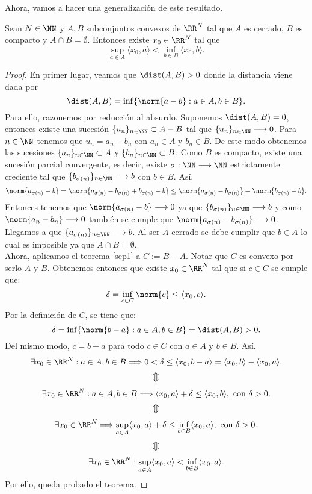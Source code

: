 Ahora, vamos a hacer una generalización de este resultado.

\bigskip
\begin{teoremaBox}\label{separacion1}
Sean $ N\in \NN $ y $ A,B $ subconjuntos convexos de $ \RR^N $ tal que $ A $ es cerrado, $ B $ es compacto y $ A \cap B = \emptyset$. Entonces existe $ x_0 \in \RR^N $ tal que
\[
\sup_{a \in A} \langle x_0,a\rangle < \inf_{b\in B} \langle x_0,b\rangle.
\]
\end{teoremaBox}
\begin{proof}
En primer lugar, veamos que $ \dist(A,B) > 0 $ donde la distancia viene dada por \[\dist(A,B) = \inf\{ \norm{a-b} : a\in A, b\in B\}.\]
Para ello, razonemos por reducción al absurdo. Suponemos $ \dist(A,B) = 0 $, entonces existe una sucesión $ \{u_n\}_{n\in\NN} \subset A-B $ tal que $ \{u_n\}_{n\in\NN} \longrightarrow 0 $. Para $ n\in\NN $ tenemos que $ u_n = a_n - b_n $ con $ a_n \in A $ y $ b_n \in B $. De este modo obtenemos las sucesiones $ \{a_n\}_{n\in\NN} \subset A $ y $ \{b_n\}_{n\in\NN} \subset B $. Como $ B $ es compacto, existe una sucesión parcial convergente, es decir, existe $ \sigma: \NN \longrightarrow \NN $ estrictamente creciente tal que $ \{b_{\sigma(n)}\}_{n\in\NN} \longrightarrow b$ con $ b \in B $. Así,
\[
\norm{a_{\sigma(n)}-b} = \norm{a_{\sigma(n)} - b_{\sigma(n)} + b_{\sigma(n)} - b} \leq  \norm{a_{\sigma(n)} - b_{\sigma(n)}} + \norm{b_{\sigma(n)} - b}.
\]
Entonces tenemos que $ \norm{a_{\sigma(n)}-b} \longrightarrow 0 $ ya que $ \{b_{\sigma(n)}\}_{n\in\NN} \longrightarrow b$ y como $ \norm{a_n - b_n}\longrightarrow 0$ también se cumple que $ \norm{a_{\sigma(n)} - b_{\sigma(n)}}\longrightarrow 0$. Llegamos a que $ \{a_{\sigma(n)}\}_{n\in\NN} \longrightarrow b$. Al ser $ A $ cerrado se debe cumplir que $ b \in A $ lo cual es imposible ya que $ A \cap B = \emptyset$. \\

Ahora, aplicamos el teorema \ref{sep1} a $ C:= B-A $. Notar que $ C $ es convexo por serlo $ A $ y $ B $. Obtenemos entonces que existe $ x_0 \in \RR^N $ tal que si $ c \in C $ se cumple que:
\[
\delta = \inf_{c \in C} \norm{c} \leq \langle x_0, c\rangle.
\]
Por la definición de $ C $, se tiene que:
\[
\delta = \inf\{ \norm{b-a} : a\in A, b\in B\} = \dist(A,B) > 0.
\] 
Del mismo modo, $ c = b-a $ para todo $ c \in C $ con $ a \in A $ y $ b \in B $. Así.
\[
\exists x_0 \in \RR^N: a\in A, b\in B \Longrightarrow 0 <\delta \leq \langle x_0, b-a\rangle = \langle x_0, b\rangle - \langle x_0,a\rangle.
\]
\[
\big\Updownarrow
\]
\[
\exists x_0 \in \RR^N: a\in A, b\in B \Longrightarrow \langle x_0, a\rangle + \delta \leq \langle x_0, b\rangle ,\text{ con } \delta > 0.
\]
\[
\big\Updownarrow
\]
\[
\exists x_0 \in \RR^N \Longrightarrow \sup_{a\in A}\langle x_0, a\rangle + \delta \leq \inf_{b \in B}\langle x_0, a\rangle, \text{ con } \delta > 0.
\]
\[
\big\Updownarrow
\]
\[
\exists x_0 \in \RR^N : \sup_{a\in A}\langle x_0, a\rangle < \inf_{b \in B}\langle x_0, a\rangle.
\]
Por ello, queda probado el teorema.
\end{proof}
\bigskip

